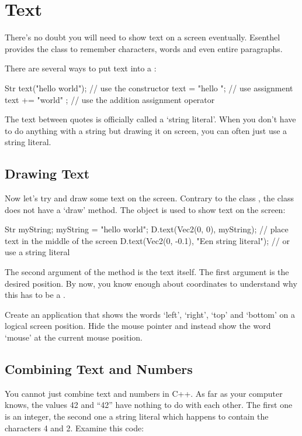 \chapter{Text}

There's no doubt you will need to show text on a screen eventually. Esenthel provides the class  to remember characters, words and even entire paragraphs.

There are several ways to put text into a :

\begin{code}
Str text("hello world"); // use the constructor
text  = "hello "; // use assignment
text += "world" ; // use the addition assignment operator
\end{code}

\begin{note}
The text between quotes is officially called a `string literal'. When you don't have to do anything with a string but drawing it on screen, you can often just use a string literal.
\end{note}

\section{Drawing Text}
Now let's try and draw some text on the screen. Contrary to the class , the  class does not have a `draw' method. The object  is used to show text on the screen:

\begin{code}
Str myString;
myString = "hello world";
D.text(Vec2(0, 0), myString); // place text in the middle of the screen
D.text(Vec2(0, -0.1), "Een string literal"); // or use a string literal
\end{code}

The second argument of the method  is the text itself. The first argument is the desired position. By now, you know enough about coordinates to understand why this has to be a .

\begin{exercise}
Create an application that shows the words `left', `right', `top' and `bottom' on a logical screen position. Hide the mouse pointer and instead show the word `mouse' at the current mouse position.
\end{exercise}

\section{Combining Text and Numbers}
You cannot just combine text and numbers in C++. As far as your computer knows, the values 42 and ``42'' have nothing to do with each other. The first one is an integer, the second one a string literal which happens to contain the characters 4 and 2. Examine this code:

